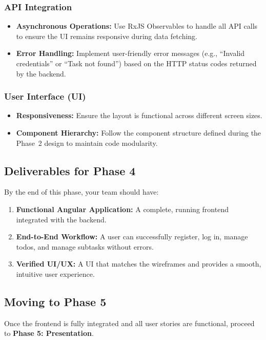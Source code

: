\subsubsection{API Integration}
\begin{itemize}
  \item \textbf{Asynchronous Operations:} Use RxJS Observables to handle all API calls to ensure the UI remains responsive during data fetching.
  \item \textbf{Error Handling:} Implement user-friendly error messages (e.g., ``Invalid credentials'' or ``Task not found'') based on the HTTP status codes returned by the backend.
\end{itemize}

\subsubsection{User Interface (UI)}
\begin{itemize}
  \item \textbf{Responsiveness:} Ensure the layout is functional across different screen sizes.
  \item \textbf{Component Hierarchy:} Follow the component structure defined during the Phase~2 design to maintain code modularity.
\end{itemize}

\subsection{Deliverables for Phase 4}
By the end of this phase, your team should have:
\begin{enumerate}
  \item \textbf{Functional Angular Application:} A complete, running frontend integrated with the backend.
  \item \textbf{End-to-End Workflow:} A user can successfully register, log in, manage todos, and manage subtasks without errors.
  \item \textbf{Verified UI/UX:} A UI that matches the wireframes and provides a smooth, intuitive user experience.
\end{enumerate}

\subsection{Moving to Phase 5}
Once the frontend is fully integrated and all user stories are functional,
proceed to \textbf{Phase 5: Presentation}.




